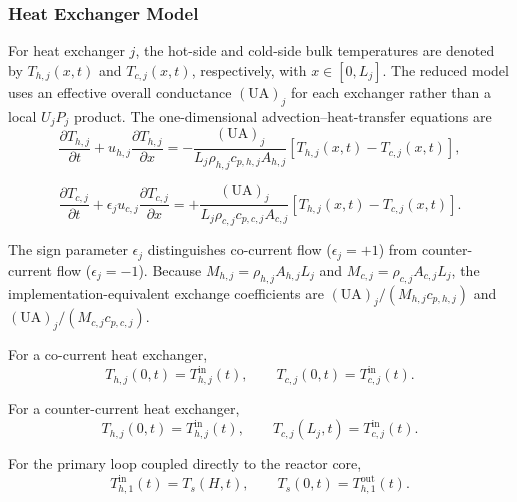 \documentclass[a4paper,12pt]{article}
\begin{document}
\subsubsection{Heat Exchanger Model}

For heat exchanger $j$, the hot-side and cold-side bulk temperatures are
denoted by $T_{h,j}(x,t)$ and $T_{c,j}(x,t)$, respectively, with
$x\in[0,L_j]$. The reduced model uses an effective overall conductance
$(\mathrm{UA})_j$ for each exchanger rather than a local $U_jP_j$ product.
The one-dimensional advection--heat-transfer equations are
\begin{equation}
\frac{\partial T_{h,j}}{\partial t}
+
u_{h,j}
\frac{\partial T_{h,j}}{\partial x}
=
-
\frac{
(\mathrm{UA})_j
}{
L_j\rho_{h,j}c_{p,h,j}A_{h,j}
}
\left[
T_{h,j}(x,t)-T_{c,j}(x,t)
\right],
\label{eq:hx_hot}
\end{equation}

\begin{equation}
\frac{\partial T_{c,j}}{\partial t}
+
\epsilon_j u_{c,j}
\frac{\partial T_{c,j}}{\partial x}
=
+
\frac{
(\mathrm{UA})_j
}{
L_j\rho_{c,j}c_{p,c,j}A_{c,j}
}
\left[
T_{h,j}(x,t)-T_{c,j}(x,t)
\right].
\label{eq:hx_cold}
\end{equation}

The sign parameter $\epsilon_j$ distinguishes co-current flow
($\epsilon_j=+1$) from counter-current flow ($\epsilon_j=-1$).
Because $M_{h,j}=\rho_{h,j}A_{h,j}L_j$ and $M_{c,j}=\rho_{c,j}A_{c,j}L_j$,
the implementation-equivalent exchange coefficients are
$(\mathrm{UA})_j/(M_{h,j}c_{p,h,j})$ and
$(\mathrm{UA})_j/(M_{c,j}c_{p,c,j})$.

For a co-current heat exchanger,
\begin{equation}
T_{h,j}(0,t)=T_{h,j}^{\mathrm{in}}(t),
\qquad
T_{c,j}(0,t)=T_{c,j}^{\mathrm{in}}(t).
\label{eq:hx_cocurrent_bc}
\end{equation}

For a counter-current heat exchanger,
\begin{equation}
T_{h,j}(0,t)=T_{h,j}^{\mathrm{in}}(t),
\qquad
T_{c,j}(L_j,t)=T_{c,j}^{\mathrm{in}}(t).
\label{eq:hx_countercurrent_bc}
\end{equation}

For the primary loop coupled directly to the reactor core,
\begin{equation}
T_{h,1}^{\mathrm{in}}(t)=T_s(H,t),
\qquad
T_s(0,t)=T_{h,1}^{\mathrm{out}}(t).
\label{eq:core_hx_coupling}
\end{equation}
\end{document}
